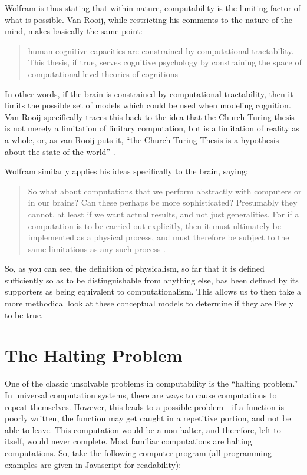 Wolfram is thus stating that within nature, computability is the limiting factor of what is possible.  Van Rooij, while restricting his comments to the nature of the mind, makes basically the same point:

\begin{quote}
human cognitive capacities are constrained by computational tractability.  This thesis, if true, serves cognitive psychology by constraining the space of computational-level theories of cognitions \citep{vanrooij2008}
\end{quote}

In other words, if the brain is constrained by computational tractability, then it limits the possible set of models which could be used when modeling cognition.  Van Rooij specifically traces this back to the idea that the Church-Turing thesis is not merely a limitation of finitary computation, but is a limitation of reality as a whole, or, as van Rooij puts it, ``the Church-Turing Thesis is a hypothesis about the state of the world'' \citep{vanrooij2008}.

Wolfram similarly applies his ideas specifically to the brain, saying:

\begin{quote}
So what about computations that we perform abstractly with computers or in our brains?  Can these perhaps be more sophisticated?  Presumably they cannot, at least if we want  actual results, and not just generalities.  For if a computation is to be carried out explicitly, then it must ultimately be implemented as a physical process, and must therefore be subject to the same limitations as any such process \citep[][p.~721]{wolfram2002}.
\end{quote}

So, as you can see, the definition of physicalism, so far that it is defined sufficiently so as to be distinguishable from anything else, has been defined by its supporters as being equivalent to computationalism.  This allows us to then take a more methodical look at these conceptual models to determine if they are likely to be true.

\section{The Halting Problem}

One of the classic unsolvable problems in computability is the ``halting problem.''  In universal computation systems, there are ways to cause computations to repeat themselves.  However, this leads to a possible problem---if a function is poorly written, the function may get caught in a repetitive portion, and not be able to leave.  This computation would be a non-halter, and therefore, left to itself, would never complete.  Most familiar computations are halting computations.  So, take the following computer program (all programming examples are given in Javascript for readability):

